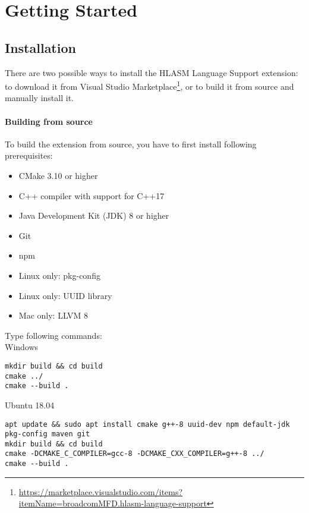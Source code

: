 \section{Getting Started}
\label{sec:start}

\subsection{Installation}
There are two possible ways to install the HLASM Language Support extension: to download it from Visual Studio Marketplace\footnote{\url{https://marketplace.visualstudio.com/items?itemName=broadcomMFD.hlasm-language-support}}, or to build it from source and manually install it.

\paragraph*{Building from source}
To build the extension from source, you have to first install following prerequisites:

\begin{itemize}
	\item CMake 3.10 or higher
	\item C++ compiler with support for C++17
	\item Java Development Kit (JDK) 8 or higher
	\item Git
	\item npm
	\item Linux only: pkg-config
	\item Linux only: UUID library
	\item Mac only: LLVM 8
\end{itemize}

Type following commands:\\

Windows
\begin{listing}[H]
\begin{verbatim}
mkdir build && cd build
cmake ../
cmake --build .
\end{verbatim}
\end{listing}

{Ubuntu 18.04}
\begin{listing}[H]
\begin{verbatim}
apt update && sudo apt install cmake g++-8 uuid-dev npm default-jdk
pkg-config maven git
mkdir build && cd build
cmake -DCMAKE_C_COMPILER=gcc-8 -DCMAKE_CXX_COMPILER=g++-8 ../
cmake --build .
\end{verbatim}
\end{listing}

